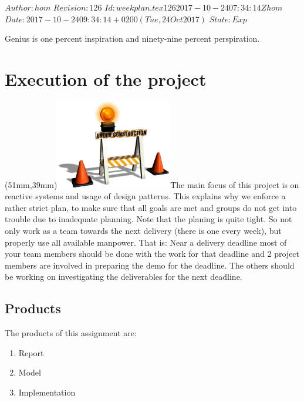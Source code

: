 \renewcommand\TheFile{weekplan.tex}
\SVN $Author: hom $
\SVN $Revision: 126 $
\SVN $Id: weekplan.tex 126 2017-10-24 07:34:14Z hom $
\SVN $Date: 2017-10-24 09:34:14 +0200 (Tue, 24 Oct 2017) $
\SVN $State: Exp $
\begin{savequote}[8cm]
  \sffamily
  Genius is one percent inspiration and ninety-nine percent perspiration.
\end{savequote}
\chapter{Execution of the project}

\parpic(51mm,39mm){\includegraphics[width=51mm]{figures/WorkinProgress.jpg}}The
main focus of this project is on reactive systems and usage of
design patterns. This explains why we enforce a rather strict plan, to
make sure that all goals are met and groups do not get into trouble
due to inadequate planning. Note that the planing is quite tight. So
not only work as a team towards the next delivery (there is one every
week), but properly use all available manpower. That is: Near a
delivery deadline most of your team members should be done with the
work for that deadline and 2 project members are  involved in preparing
the demo for the deadline. The others should be working on
investigating the deliverables for the next deadline.

\section{Products}

The products of this assignment are:
\begin{enumerate}
\item Report
\item Model
\item Implementation
\end{enumerate}


